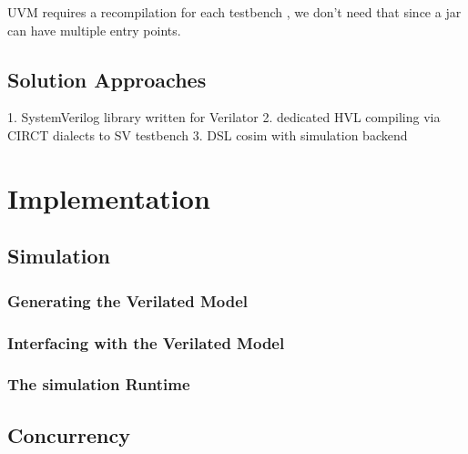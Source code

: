 \documentclass[12pt]{book}
\begin{document}
UVM requires a recompilation for each testbench \cite{salemi2013uvm}, we don't need that since a jar can have multiple entry points.

\section{Solution Approaches} %

1. SystemVerilog library written for Verilator
2. dedicated HVL compiling via CIRCT dialects to SV testbench
3. DSL cosim with simulation backend




\chapter{Implementation} %

\section{Simulation} %

\subsection{Generating the Verilated Model} 

\subsection{Interfacing with the Verilated Model}

\subsection{The simulation Runtime} 

\section{Concurrency} %
\end{document}
